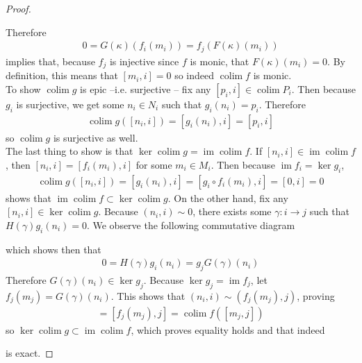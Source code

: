 \documentclass{article}
\DeclareMathOperator{\im}{\mathrm{im}}
\DeclareMathOperator{\colim}{\mathrm{colim}}
\begin{document}
\begin{proof}
\begin{center}
\end{center}
Therefore 
\begin{align*}
    0=G(\kappa)(f_i(m_i))=f_j(F(\kappa)(m_i)) 
\end{align*}
implies that, because $f_j$ is injective since $f$ is monic, that $F(\kappa)(m_i)=0$. By definition, this means that $[m_i,i]=0$ so indeed $\colim f$ is monic.\\
To show $\colim g$ is epic --i.e. surjective -- fix any $[p_i,i]\in \colim P_i$. Then because $g_i$ is surjective, we get some $n_i\in N_i$ such that $g_i(n_i)=p_i$. Therefore
\begin{align*}
    \colim g([n_i,i])=[g_i(n_i),i]=[p_i,i]
\end{align*}
so $\colim g$ is surjective as well.\\
The last thing to show is that $\ker \colim g=\im \colim f$. If $[n_i,i]\in \im \colim f$, then $[n_i,i]=[f_i(m_i),i]$ for some $m_i\in M_i$. Then because $\im f_i=\ker g_i$,
\begin{align*}
    \colim g([n_i,i])=[g_i(n_i),i]=[g_i\circ f_i(m_i),i]=[0,i]=0
\end{align*}
shows that $\im \colim f \subset \ker \colim g$. On the other hand, fix any $[n_i,i]\in \ker \colim g$. Because $(n_i,i)\sim 0$, there exists some $\gamma:i\to j$ such that $H(\gamma) g_i(n_i)=0$. We observe the following commutative diagram
\begin{center}
\end{center}
which shows then that
\begin{align*}
    0=H(\gamma)g_i(n_i)=g_j G(\gamma)(n_i)
\end{align*}
Therefore $G(\gamma)(n_i)\in \ker g_j$. Because $\ker g_j=\im f_j$, let $f_j(m_j)=G(\gamma)(n_i)$. This shows that $(n_i,i)\sim (f_j(m_j),j)$, proving
\begin{align*}
    [n_i,i]=[f_j(m_j),j]=\colim f([m_j,j])
\end{align*}
so $\ker \colim g\subset \im \colim f$, which proves equality holds and that indeed
\begin{center}
\end{center}
is exact.
\end{proof}
\end{document}

